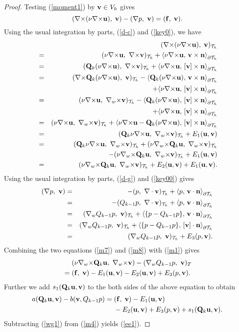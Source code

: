 \documentclass[11pt]{amsart}
\newcommand{\bu}{{\bf u}}
\newcommand{\bv}{{\bf v}}
\newcommand{\bQ}{{\bf Q}}
\newcommand{\curl}{{\nabla\times}}
\newcommand{\cw}{{\nabla_w\times}}
\def\T{{\mathcal T}}
\def\l{{\langle}}
\def\r{{\rangle}}
\def\bbf{{\bf f}}
\def\bn{{\bf n}}
\def\ad#1{\begin{aligned}#1\end{aligned}}  \def\b#1{\mathbf{#1}} \def\hb#1{\hat{\mathbf{#1}}}
\def\a#1{\begin{align*}#1\end{align*}} \def\an#1{\begin{align}#1\end{align}} \def\t#1{\hbox{#1}}
\begin{document}
\begin{proof}
Testing (\ref{moment1}) by $\bv\in V_h$ gives
\begin{equation}\label{m1}
(\curl(\nu\curl\bu),\;\bv)- (\nabla p,\ \bv)=(\bbf,\; \bv).
\end{equation}
Using the usual integration by parts, (\ref{d-c}) and (\ref{key0}), we have
\begin{eqnarray}
 & & (\curl(\nu\curl\bu),\;\bv)_{\T_h}\nonumber\\
 &=&(\nu\curl\bu,\ \curl\bv)_{\T_h}+\l\nu\curl\bu,\,\bv\times\bn\r_{\partial\T_h}\nonumber\\
&=&(\bQ_k(\nu\curl\bu),\ \curl\bv)_{\T_h}+\l\nu\curl\bu,\,[\bv]\times\bn\r_{\partial\T_h}\nonumber\\
&=&(\curl\bQ_k(\nu\curl\bu),\ \bv)_{\T_h}-\l\bQ_k(\nu\curl\bu),\,\bv\times\bn\r_{\partial\T_h}\nonumber\\
& &\quad +\l\nu\curl\bu,\,[\bv]\times\bn\r_{\partial\T_h}\nonumber\\
&=&(\nu\curl\bu,\ \cw\bv)_{\T_h}-\l\bQ_k(\nu\curl\bu),\,[\bv]\times\bn\r_{\partial\T_h}\nonumber\\
& &\quad +\l\nu\curl\bu,\,[\bv]\times\bn\r_{\partial\T_h}\nonumber\\
&=&(\nu\curl\bu,\ \cw\bv)_{\T_h}+\l\nu\curl\bu-\bQ_k(\nu\curl\bu),\,
    [\bv]\times\bn\r_{\partial\T_h}\nonumber\\
&=&(\bQ_k\nu\curl\bu,\ \cw\bv)_{\T_h}+E_1(\bu,\bv)\nonumber\\
&=&(\bQ_k\nu\curl\bu,\ \cw\bv)_{\T_h}+(\nu\cw\bQ_k\bu,\ \cw\bv)_{\T_h}\nonumber\\
& &\quad -(\nu\cw\bQ_k\bu,\ \cw\bv)_{\T_h}+E_1(\bu,\bv)\nonumber\\
&=&(\nu\cw\bQ_k\bu,\ \cw\bv)_{\T_h}+E_2(\bu,\bv)+E_1(\bu,\bv).\label{m7}
\end{eqnarray}
Using the usual integration by parts,  (\ref{d-g}) and (\ref{key00}) gives
\begin{eqnarray}
(\nabla p,\ \bv)&=&-(p,\ \nabla\cdot\bv)_{\T_h}+\l  p,\,\bv\cdot\bn\r_{\partial\T_h}\nonumber\\
&=&-(Q_{k-1} p,\ \nabla\cdot\bv)_{\T_h}+\l p,\,\bv\cdot\bn\r_{\partial\T_h}\nonumber\\
&=&(\nabla_w Q_{k-1} p,\ \bv)_{\T_h}+\l \{p-Q_{k-1}p\},\,\bv\cdot\bn\r_{\partial\T_h}\nonumber\\
&=&(\nabla_w Q_{k-1} p,\ \bv)_{\T_h}+\l \{p-Q_{k-1}p\},\,[\bv]\cdot\bn\r_{\partial\T_h}\nonumber\\
&=&(\nabla_w Q_{k-1} p,\ \bv)_{\T_h}+E_3(p,\bv).\label{m8}
\end{eqnarray}
Combining the two equations (\ref{m7}) and (\ref{m8}) with (\ref{m1}) gives
\a{ &\quad \
(\nu\cw\bQ_k\bu,\ \cw\bv) -(\nabla_w Q_{k-1} p,\ \bv)_T\\
   & =(\bbf,\; \bv)-E_1(\bu,\bv)-E_2(\bu,\bv)+E_3(p,\bv). }
Further we add $s_1(\bQ_k\bu,\bv)$ to the both sides of the above equation  to obtain
\an{ \label{m4}\ad{
a(\bQ_k\bu,\bv)- b(\bv, Q_{k-1} p)&=(\bbf,\; \bv)-E_1(\bu,\bv)\\
                &\quad \ -E_2(\bu,\bv)+E_3(p,\bv)+s_1(\bQ_k\bu,\bv). } }
Subtracting (\ref{wg1}) from (\ref{m4})   yields (\ref{ee1}).


\end{proof}
\end{document}
